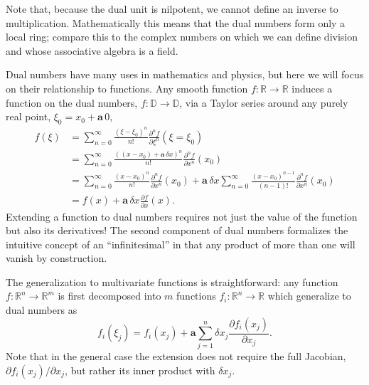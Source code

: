 \documentclass[11pt]{article}
\begin{document}
Note that, because the dual unit is nilpotent, we cannot define an inverse to multiplication.  
Mathematically this means that the dual numbers form only a local ring; compare this to 
the complex numbers on which we can define division and whose associative algebra is a field.

Dual numbers have many uses in mathematics and physics, but here we will focus on their
relationship to functions.  Any smooth function $f : \mathbb{R} \rightarrow \mathbb{R}$ 
induces a function on the dual numbers, $f : \mathbb{D} \rightarrow \mathbb{D}$, 
via a Taylor series around any purely real point, $\xi_{0} = x_{0} + \mathbf{a} \, 0$,
%
\begin{align*}
f \! \left( \xi \right) 
&= 
\sum_{n = 0}^{\infty} \frac{ \left( \xi - \xi_{0} \right)^{n} }{n!} 
\frac{ \partial^{n} f }{ \partial \xi^{n} } \! \left( \xi = \xi_{0} \right) 
\\
&= 
\sum_{n = 0}^{\infty} \frac{ \left( \left( x - x_{0} \right) + \mathbf{a} \, \delta x \right)^{n} }{n!} 
\frac{ \partial^{n} f }{ \partial x^{n} } \! \left( x_{0} \right)
\\
&= 
\sum_{n = 0}^{\infty} \frac{ \left( x - x_{0} \right)^{n} }{n!} 
\frac{ \partial^{n} f }{ \partial x^{n} } \! \left( x_{0} \right)
+ \mathbf{a} \, \delta x \sum_{n = 0}^{\infty} \frac{ \left( x - x_{0} \right)^{n - 1} }{\left( n - 1 \right)!} 
\frac{ \partial^{n} f }{ \partial x^{n} } \! \left( x_{0} \right) 
\\
&= 
f \! \left( x \right) 
+ \mathbf{a} \, \delta x \frac{ \partial f }{ \partial x } \! \left( x \right).
\end{align*}
%
Extending a function to dual numbers requires not just the value of the function
but also its derivatives!  The second component of dual numbers formalizes
the intuitive concept of an ``infinitesimal'' in that any product of more than one
will vanish by construction.

The generalization to multivariate functions is straightforward: any function 
$f : \mathbb{R}^{n} \rightarrow \mathbb{R}^{m}$ is first decomposed into $m$
functions $f_{i} : \mathbb{R}^{n} \rightarrow \mathbb{R}$ which generalize
to dual numbers as
%
\begin{equation} \label{dualFunction}
f_{i} \! \left( \xi_{j} \right) = f_{i} \! \left( x_{j} \right) 
+ \mathbf{a} \sum_{j = 1}^{n} \delta x_{j} \frac{ \partial f_{i} \! \left( x_{j} \right) }{ \partial x_{j} }.
\end{equation}
%
Note that in the general case the extension does not require the full Jacobian, 
$ \partial f_{i} \! \left( x_{j} \right) \! / \partial x_{j}$, but rather its inner product with 
$\delta x_{j}$.
\end{document}

